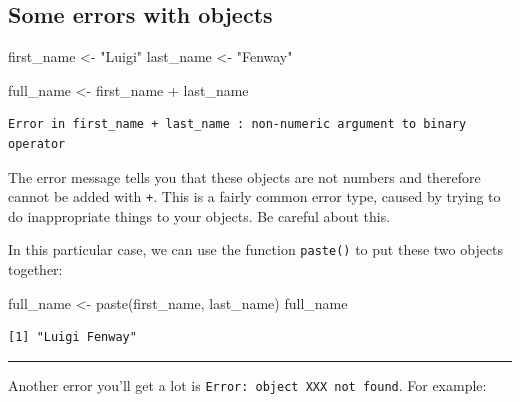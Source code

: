 \documentclass[
  letterpaper,
  DIV=11,
  numbers=noendperiod]{scrreprt}
\newenvironment{Shaded}{\begin{snugshade}}{\end{snugshade}}
\newcommand{\FunctionTok}[1]{\textcolor[rgb]{0.28,0.35,0.67}{#1}}
\newcommand{\NormalTok}[1]{\textcolor[rgb]{0.00,0.23,0.31}{#1}}
\newcommand{\OtherTok}[1]{\textcolor[rgb]{0.00,0.23,0.31}{#1}}
\newcommand{\SpecialCharTok}[1]{\textcolor[rgb]{0.37,0.37,0.37}{#1}}
\newcommand{\StringTok}[1]{\textcolor[rgb]{0.13,0.47,0.30}{#1}}
\begin{document}
\hypertarget{some-errors-with-objects}{%
\subsection{Some errors with objects}\label{some-errors-with-objects}}

\begin{Shaded}
\begin{Highlighting}[]
\NormalTok{first\_name }\OtherTok{\textless{}{-}} \StringTok{"Luigi"}
\NormalTok{last\_name }\OtherTok{\textless{}{-}} \StringTok{"Fenway"}
\end{Highlighting}
\end{Shaded}

\begin{Shaded}
\begin{Highlighting}[]
\NormalTok{full\_name }\OtherTok{\textless{}{-}}\NormalTok{ first\_name }\SpecialCharTok{+}\NormalTok{ last\_name}
\end{Highlighting}
\end{Shaded}

\begin{verbatim}
Error in first_name + last_name : non-numeric argument to binary operator
\end{verbatim}

The error message tells you that these objects are not numbers and
therefore cannot be added with \texttt{+}. This is a fairly common error
type, caused by trying to do inappropriate things to your objects. Be
careful about this.

In this particular case, we can use the function \texttt{paste()} to put
these two objects together:

\begin{Shaded}
\begin{Highlighting}[]
\NormalTok{full\_name }\OtherTok{\textless{}{-}} \FunctionTok{paste}\NormalTok{(first\_name, last\_name)}
\NormalTok{full\_name}
\end{Highlighting}
\end{Shaded}

\begin{verbatim}
[1] "Luigi Fenway"
\end{verbatim}

\begin{center}\rule{0.5\linewidth}{0.5pt}\end{center}

Another error you'll get a lot is
\texttt{Error:\ object\ \textquotesingle{}XXX\textquotesingle{}\ not\ found}.
For example:
\end{document}
